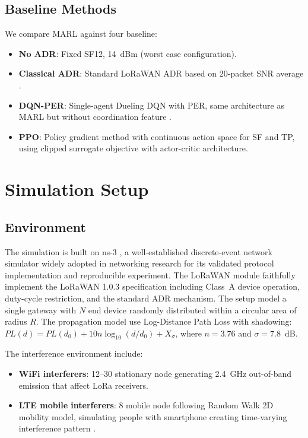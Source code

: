 \documentclass[conference]{IEEEtran}
\begin{document}
\subsection{Baseline Methods}

We compare MARL against four baseline:
\begin{itemize}
    \item \textbf{No ADR}: Fixed SF12, 14~dBm (worst case configuration).
    \item \textbf{Classical ADR}: Standard LoRaWAN ADR based on 20-packet SNR average \cite{semtech_adr}.
    \item \textbf{DQN-PER}: Single-agent Dueling DQN with PER, same architecture as MARL but without coordination feature \cite{van2016deep, schaul2016per}.
    \item \textbf{PPO}: Policy gradient method with continuous action space for SF and TP, using clipped surrogate objective \cite{schulman2017ppo} with actor-critic architecture.
\end{itemize}

\section{Simulation Setup}
\label{sec:setup}

\subsection{Environment}

The simulation is built on ns-3 \cite{riley2010ns3}, a well-established discrete-event network simulator widely adopted in networking research for its validated protocol implementation and reproducible experiment. The LoRaWAN module faithfully implement the LoRaWAN 1.0.3 specification including Class~A device operation, duty-cycle restriction, and the standard ADR mechanism. The setup model a single gateway with $N$ end device randomly distributed within a circular area of radius $R$. The propagation model use Log-Distance Path Loss with shadowing: $PL(d) = PL(d_0) + 10n\log_{10}(d/d_0) + X_\sigma$, where $n = 3.76$ and $\sigma = 7.8$~dB.

The interference environment include:
\begin{itemize}
    \item \textbf{WiFi interferers}: 12--30 stationary node generating 2.4~GHz out-of-band emission that affect LoRa receivers.
    \item \textbf{LTE mobile interferers}: 8 mobile node following Random Walk 2D mobility model, simulating people with smartphone creating time-varying interference pattern \cite{hosseinzadeh2020empirical}.
\end{itemize}
\end{document}
